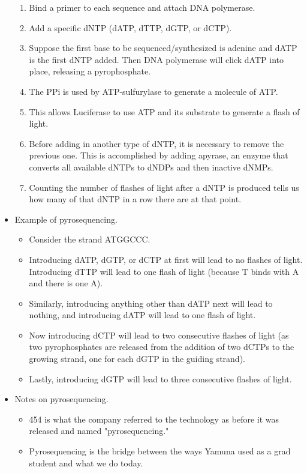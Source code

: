 \documentclass[../notes.tex]{subfiles}
\begin{document}
\begin{itemize}
\begin{enumerate}
        \item Bind a primer to each sequence and attach DNA polymerase.
        \item Add a specific dNTP (dATP, dTTP, dGTP, or dCTP).
        \item Suppose the first base to be sequenced/synthesized is adenine and dATP is the first dNTP added. Then DNA polymerase will click dATP into place, releasing a pyrophosphate.
        \item The PPi is used by ATP-sulfurylase to generate a molecule of ATP.
        \item This allows Luciferase to use ATP and its substrate to generate a flash of light.
        \item Before adding in another type of dNTP, it is necessary to remove the previous one. This is accomplished by adding apyrase, an enzyme that converts all available dNTPs to dNDPs and then inactive dNMPs.
        \item Counting the number of flashes of light after a dNTP is produced tells us how many of that dNTP in a row there are at that point.
    \end{enumerate}
    \item Example of pyrosequencing.
    \begin{itemize}
        \item Consider the strand ATGGCCC.
        \item Introducing dATP, dGTP, or dCTP at first will lead to no flashes of light. Introducing dTTP will lead to one flash of light (because T binds with A and there is one A).
        \item Similarly, introducing anything other than dATP next will lead to nothing, and introducing dATP will lead to one flash of light.
        \item Now introducing dCTP will lead to two consecutive flashes of light (as two pyrophosphates are released from the addition of two dCTPs to the growing strand, one for each dGTP in the guiding strand).
        \item Lastly, introducing dGTP will lead to three consecutive flashes of light. 
    \end{itemize}
    \item Notes on pyrosequencing.
    \begin{itemize}
        \item 454 is what the company referred to the technology as before it was released and named "pyrosequencing."
        \item Pyrosequencing is the bridge between the ways Yamuna used as a grad student and what we do today.

\end{itemize}
\end{itemize}
\end{document}

